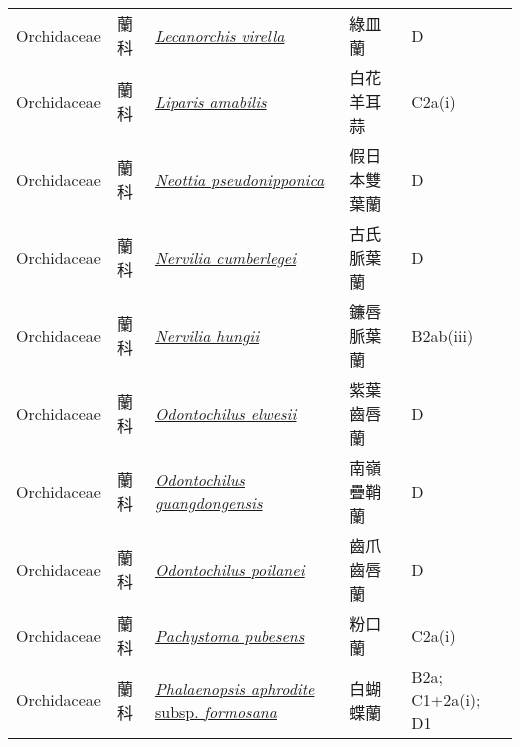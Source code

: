 {\begin{longtable}{p{2.5cm}p{2.5cm}p{4.5cm}p{2.5cm}p{3cm}}
    Orchidaceae & 蘭科 & \href{http://www.theplantlist.org/tpl1.1/search?q=Lecanorchis+virella}{\textit{Lecanorchis virella} } & 綠皿蘭 & D \index{Lecanorchis@\textit{Lecanorchis}!virella@\textit{virella}}  \index{綠皿蘭} \\
    Orchidaceae & 蘭科 & \href{http://www.theplantlist.org/tpl1.1/search?q=Liparis+amabilis}{\textit{Liparis amabilis} } & 白花羊耳蒜 & C2a(i) \index{Liparis@\textit{Liparis}!amabilis@\textit{amabilis}}  \index{白花羊耳蒜} \\
    Orchidaceae & 蘭科 & \href{http://www.theplantlist.org/tpl1.1/search?q=Neottia+pseudonipponica}{\textit{Neottia pseudonipponica} } & 假日本雙葉蘭 & D \index{Neottia@\textit{Neottia}!pseudonipponica@\textit{pseudonipponica}}  \index{假日本雙葉蘭} \\
    Orchidaceae & 蘭科 & \href{http://www.theplantlist.org/tpl1.1/search?q=Nervilia+cumberlegei}{\textit{Nervilia cumberlegei} } & 古氏脈葉蘭 & D \index{Nervilia@\textit{Nervilia}!cumberlegei@\textit{cumberlegei}}  \index{古氏脈葉蘭} \\
    Orchidaceae & 蘭科 & \href{http://www.theplantlist.org/tpl1.1/search?q=Nervilia+hungii}{\textit{Nervilia hungii} } & 鐮唇脈葉蘭 & B2ab(iii) \index{Nervilia@\textit{Nervilia}!hungii@\textit{hungii}}  \index{鐮唇脈葉蘭} \\
    Orchidaceae & 蘭科 & \href{http://www.theplantlist.org/tpl1.1/search?q=Odontochilus+elwesii}{\textit{Odontochilus elwesii} } & 紫葉齒唇蘭 & D \index{Odontochilus@\textit{Odontochilus}!elwesii@\textit{elwesii}}  \index{紫葉齒唇蘭} \\
    Orchidaceae & 蘭科 & \href{http://www.theplantlist.org/tpl1.1/search?q=Odontochilus+guangdongensis}{\textit{Odontochilus guangdongensis} } & 南嶺疊鞘蘭 & D \index{Odontochilus@\textit{Odontochilus}!guangdongensis@\textit{guangdongensis}}  \index{南嶺疊鞘蘭} \\
    Orchidaceae & 蘭科 & \href{http://www.theplantlist.org/tpl1.1/search?q=Odontochilus+poilanei}{\textit{Odontochilus poilanei} } & 齒爪齒唇蘭 & D \index{Odontochilus@\textit{Odontochilus}!poilanei@\textit{poilanei}}  \index{齒爪齒唇蘭} \\
    Orchidaceae & 蘭科 & \href{http://www.theplantlist.org/tpl1.1/search?q=Pachystoma+pubesens}{\textit{Pachystoma pubesens} } & 粉口蘭 & C2a(i) \index{Pachystoma@\textit{Pachystoma}!pubesens@\textit{pubesens}}  \index{粉口蘭} \\
    Orchidaceae & 蘭科 & \href{http://www.theplantlist.org/tpl1.1/search?q=Phalaenopsis+aphrodite+subsp.+formosana}{\textit{Phalaenopsis aphrodite} subsp. \textit{formosana} } & 白蝴蝶蘭 & B2a; C1+2a(i); D1 \index{Phalaenopsis@\textit{Phalaenopsis}!aphrodite@\textit{aphrodite}!subsp. formosana@subsp. \textit{formosana}}  \index{白蝴蝶蘭} \\

\end{longtable}}
